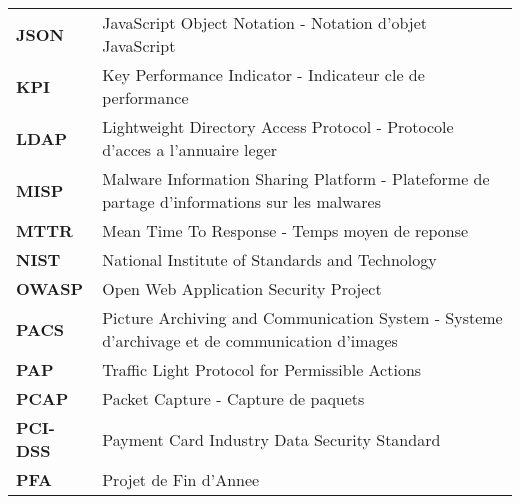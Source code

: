 \begin{longtable}{p{3cm} p{12cm}}
    \textbf{JSON}    & JavaScript Object Notation - Notation d'objet JavaScript                                               \\[0.3cm]

    \textbf{KPI}     & Key Performance Indicator - Indicateur cle de performance                                              \\[0.3cm]

    \textbf{LDAP}    & Lightweight Directory Access Protocol - Protocole d'acces a l'annuaire leger                           \\[0.3cm]

    \textbf{MISP}    & Malware Information Sharing Platform - Plateforme de partage d'informations sur les malwares           \\[0.3cm]

    \textbf{MTTR}    & Mean Time To Response - Temps moyen de reponse                                                         \\[0.3cm]

    \textbf{NIST}    & National Institute of Standards and Technology                                                         \\[0.3cm]

    \textbf{OWASP}   & Open Web Application Security Project                                                                  \\[0.3cm]

    \textbf{PACS}    & Picture Archiving and Communication System - Systeme d'archivage et de communication d'images          \\[0.3cm]

    \textbf{PAP}     & Traffic Light Protocol for Permissible Actions                                                         \\[0.3cm]

    \textbf{PCAP}    & Packet Capture - Capture de paquets                                                                    \\[0.3cm]

    \textbf{PCI-DSS} & Payment Card Industry Data Security Standard                                                           \\[0.3cm]

    \textbf{PFA}     & Projet de Fin d'Annee                                                                                  \\[0.3cm]


\end{longtable}
